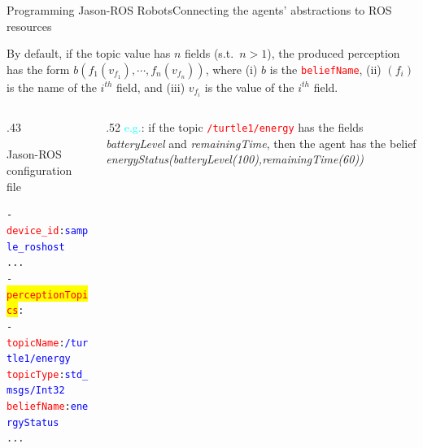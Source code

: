 \documentclass[compress]{beamer}
\newcommand{\yamlkey}[1]{\textcolor{red}{\texttt{#1}}}
\newcommand{\yamlvalue}[1]{\textcolor{blue}{\texttt{#1}}}
\begin{document}
\begin{frame}[fragile]{Programming Jason-ROS Robots}{Connecting the agents' abstractions to ROS resources}


\footnotesize
By default, if the topic value has $n$ fields (s.t.~$n>1$), the produced perception has the form $b(f_1(v_{f_1}),\cdots,f_n(v_{f_n}))$, where (i) $b$ is the \yamlkey{beliefName}, (ii) $(f_i)$ is the name of the $i^{th}$ field, and (iii) $v_{f_i}$ is the value of the $i^{th}$ field.
\vspace{.5cm}

\begin{columns}
 \begin{column}{.43\textwidth}
 
\begin{block}{{\scriptsize Jason-ROS configuration file}}
\scriptsize
  \begin{alltt}
- \yamlkey{device_id}: \yamlvalue{sample_roshost}    
     ...
  - \colorbox{yellow}{\yamlkey{perceptionTopics}}:     
    - \yamlkey{topicName}: \yamlvalue{/turtle1/energy}
      \yamlkey{topicType}: \yamlvalue{std_msgs/Int32}
      \yamlkey{beliefName}: \yamlvalue{energyStatus} 
     ...
  \end{alltt}
\end{block}  

\end{column}

\hspace{-30pt}


 \begin{column}{.52\textwidth}
 \scriptsize
 \textcolor{cyan}{e.g.}: if the topic \yamlkey{/turtle1/energy} has the fields \textit{batteryLevel} and \textit{remainingTime}, then the agent has the belief\\ \textit{energyStatus(batteryLevel(100),remainingTime(60))}

 
 \end{column}
 

\end{columns}
\end{frame}
\end{document}
